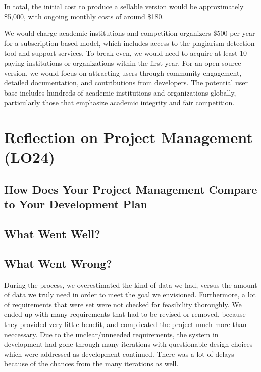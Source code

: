 \documentclass{article}
\begin{document}
In total, the initial cost to produce a sellable version would be approximately \$5,000, with ongoing monthly costs of around \$180.

We would charge academic institutions and competition organizers \$500 per year for a subscription-based model, which includes access to the plagiarism detection tool and support services. To break even, we would need to acquire at least 10 paying institutions or organizations within the first year. For an open-source version, we would focus on attracting users through community engagement, detailed documentation, and contributions from developers. The potential user base includes hundreds of academic institutions and organizations globally, particularly those that emphasize academic integrity and fair competition.

\section{Reflection on Project Management (LO24)}


\subsection{How Does Your Project Management Compare to Your Development Plan}


\subsection{What Went Well?}


\subsection{What Went Wrong?}

During the process, we overestimated the kind of data we had, versus the amount
of data we truly need in order to meet the goal we envisioned. Furthermore, a
lot of requirements that were set were not checked for feasibility thoroughly.
We ended up with many requirements that had to be revised or removed, because
they provided very little benefit, and complicated the project much more than
neccessary. Due to the unclear/unneeded requirements, the system in development
had gone through many iterations with questionable design choices which were
addressed as development continued. There was a lot of delays because of the
chances from the many iterations as well. 
\end{document}
